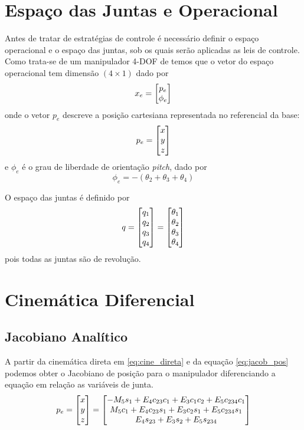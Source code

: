 \section{Espaço das Juntas e Operacional}
Antes de tratar de estratégias de controle é necessário definir o espaço operacional e o espaço das juntas,  sob os quais serão aplicadas as leis de controle. 
Como trata-se de um manipulador 4-DOF de temos que o vetor do espaço operacional tem dimensão $(4 \times 1)$ dado por 
\begin{equation} \label{eq:operational_space}
{x_e} = \begin{bmatrix}{p}_e \\ \phi_e\end{bmatrix}
\end{equation}
onde o vetor ${p}_e$ descreve a posição cartesiana representada no referencial da base:
\begin{equation}
{p}_e = \begin{bmatrix}x \\ y \\ z\end{bmatrix}
\end{equation}
e $\phi_e$ é o grau de liberdade de orientação \textit{pitch}, dado por
\begin{equation} \label{eq:orientacao}
\phi_e = -(\theta_2 + \theta_3 + \theta_4)
\end{equation}

O espaço das juntas é definido por 
\begin{equation} \label{joint_space}
{q} = \begin{bmatrix}q_1 \\ q_2 \\ q_3 \\ q_4\end{bmatrix} = \begin{bmatrix}\theta_1 \\ \theta_2 \\ \theta_3 \\ \theta_4  \end{bmatrix}
\end{equation} 
pois todas as juntas são de revolução.

\section{Cinemática Diferencial}

\subsection{Jacobiano Analítico}
A partir da cinemática direta em \eqref{eq:cine_direta} e da equação \ref{eq:jacob_pos} podemos obter o Jacobiano de posição para o manipulador diferenciando a equação em relação as variáveis de junta. 
\begin{equation}
{p}_e = \begin{bmatrix}x \\ y \\ z\end{bmatrix} =
\begin{bmatrix}
   -M_5 s_1 + E_4 c_{23}c_1 + E_3 c_1 c_2 + E_5 c_{234} c_1 \\
     M_5 c_1+E_4 c_{23} s_1 + E_3 c_2 s_1 + E_5 c_{234} s_1 \\
   						 E_4 s_{23} + E_3 s_2 + E_5 s_{234} \\
\end{bmatrix}
\end{equation}

